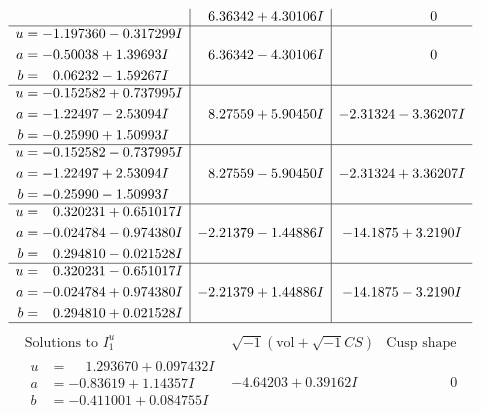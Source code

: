 \documentclass[1p]{elsarticle_modified}
\theoremstyle{definition}
\newcommand{\I}{\sqrt{-1}}
\begin{document}
$$\begin{array}{c|c|c}
 & \phantom{-}6.36342 + 4.30106 I & \phantom{-0.000000 } 0 \\ \hline\begin{aligned}
u &= -1.197360 - 0.317299 I \\
a &= -0.50038 + 1.39693 I \\
b &= \phantom{-}0.06232 - 1.59267 I\end{aligned}
 & \phantom{-}6.36342 - 4.30106 I & \phantom{-0.000000 } 0 \\ \hline\begin{aligned}
u &= -0.152582 + 0.737995 I \\
a &= -1.22497 - 2.53094 I \\
b &= -0.25990 + 1.50993 I\end{aligned}
 & \phantom{-}8.27559 + 5.90450 I & -2.31324 - 3.36207 I \\ \hline\begin{aligned}
u &= -0.152582 - 0.737995 I \\
a &= -1.22497 + 2.53094 I \\
b &= -0.25990 - 1.50993 I\end{aligned}
 & \phantom{-}8.27559 - 5.90450 I & -2.31324 + 3.36207 I \\ \hline\begin{aligned}
u &= \phantom{-}0.320231 + 0.651017 I \\
a &= -0.024784 - 0.974380 I \\
b &= \phantom{-}0.294810 - 0.021528 I\end{aligned}
 & -2.21379 - 1.44886 I & -14.1875 + 3.2190 I \\ \hline\begin{aligned}
u &= \phantom{-}0.320231 - 0.651017 I \\
a &= -0.024784 + 0.974380 I \\
b &= \phantom{-}0.294810 + 0.021528 I\end{aligned}
 & -2.21379 + 1.44886 I & -14.1875 - 3.2190 I\\
 \hline 
 \end{array}$$\newpage$$\begin{array}{c|c|c}  
\text{Solutions to }I^u_{1}& \I (\text{vol} + \sqrt{-1}CS) & \text{Cusp shape}\\
 \hline 
\begin{aligned}
u &= \phantom{-}1.293670 + 0.097432 I \\
a &= -0.83619 + 1.14357 I \\
b &= -0.411001 + 0.084755 I\end{aligned}
 & -4.64203 + 0.39162 I & \phantom{-0.000000 } 0 \\ \hline\begin{aligned}

\end{aligned}
\end{array}$$
\end{document}
